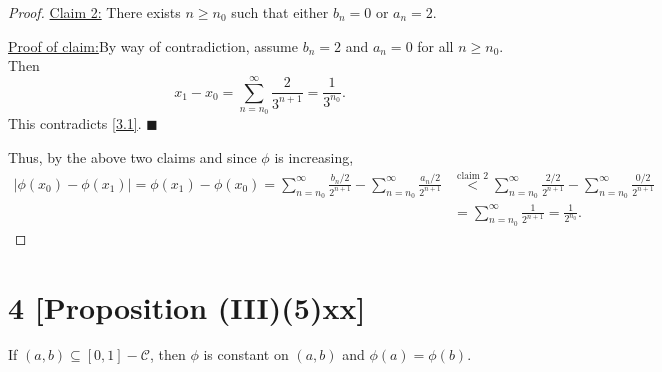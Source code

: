 \documentclass[12pt]{article}
\newenvironment{claimproof}[1]{\par\noindent\underline{Proof of claim:}\space#1}{\hfill $\blacksquare$\vspace{5mm}}
\begin{document}
\begin{proof}
\vspace{-4mm}
\underline{Claim 2:} There exists $n \geq n_{0}$ such that either $b_{n} = 0$ or $a_{n} = 2$.
\begin{claimproof}
By way of contradiction, assume $b_{n} = 2$ and $a_{n} = 0$ for all $n\geq n_{0}$. Then 
\[ x_{1} - x_{0} = \sum_{n=n_{0}}^{\infty}\frac{2}{3^{n+1}} = \frac{1}{3^{n_0}}. \]
This contradicts \eqref{3.1}.
\end{claimproof}

\vspace{-4mm}
Thus, by the above two claims and since $\phi$ is increasing,
\begin{align*}
|\phi(x_{0}) - \phi(x_{1})| = \phi(x_{1}) - \phi(x_{0}) = \sum_{n=n_{0}}^{\infty}\frac{b_{n}/2}{2^{n+1}} -
\sum_{n=n_{0}}^{\infty}\frac{a_{n}/2}{2^{n+1}} & \stackrel{\text{claim 2}}{<} \sum_{n=n_{0}}^{\infty}\frac{2/2}{2^{n+1}} - \sum_{n=n_{0}}^{\infty}\frac{0/2}{2^{n+1}} \\
& = \sum_{n=n_0}^{\infty}\frac{1}{2^{n+1}} = \frac{1}{2^{n_{0}}}.
\end{align*}
\end{proof}


\newpage 
\section*{4 [Proposition (III)(5)xx]}
If $(a,b) \subseteq [0,1] - \mathcal{C}$, then $\phi$ is constant on $(a,b)$ and $\phi(a) = \phi(b)$.
\end{document}
